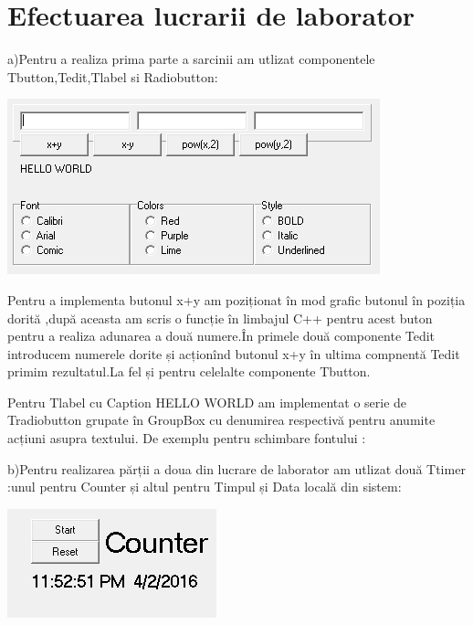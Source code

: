 \section{Efectuarea lucrarii de laborator}
a)Pentru a realiza prima parte a sarcinii am utlizat componentele Tbutton,Tedit,Tlabel si Radiobutton:\\
\begin{center}
\includegraphics[scale=1]{images/A}
\end{center}
Pentru a implementa butonul x+y am poziționat în mod grafic butonul în poziția dorită ,după aceasta am
scris o funcție în limbajul C++ pentru acest buton pentru a realiza adunarea a două numere.În primele
două componente Tedit introducem numerele dorite și acționînd butonul x+y în ultima compnentă Tedit
primim rezultatul.La fel și pentru celelalte componente Tbutton.\\
\begin{center}

\end{center}
Pentru Tlabel cu Caption HELLO WORLD am implementat o serie de Tradiobutton grupate în GroupBox
cu denumirea respectivă pentru anumite acțiuni asupra textului.
De exemplu pentru schimbare fontului :\\
\begin{center}

\end{center}
b)Pentru realizarea părții a doua din lucrare de laborator am utlizat două Ttimer :unul pentru Counter și
altul pentru Timpul și Data locală din sistem:\\
\begin{center}
\includegraphics[scale=1]{images/B}
\end{center}
